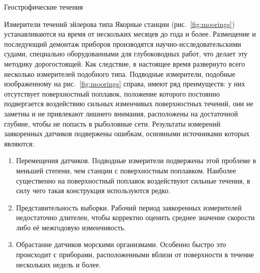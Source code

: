 \begin{chapter}{Геострофические течения}
\begin{section}{Измерители течений эйлерова типа}
Якорные станции (рис.~\ref{fig:moorings}) устанавливаются
на время от нескольких месяцев до года и более. Размещение и последующий 
демонтаж приборов производятся научно-исследовательскими судами, 
специально оборудованными для глубоководных работ, что делает эту методику 
дорогостоящей. Как следствие, в настоящее время развернуто всего
несколько измерителей подобного типа.
Подводные измерители, подобные изображенному на рис.~\ref{fig:moorings}
справа, имеют ряд преимуществ: у них отсутствует поверхностный
поплавок, положение которого постоянно подвергается воздействию
сильных изменчивых поверхностных течений, они не заметны и не
привлекают лишнего внимания, расположены на достаточной глубине, чтобы
не попасть в рыболовные сети. Результаты измерений заякоренных
датчиков подвержены ошибкам, основными источниками которых являются:
%
\begin{enumerate}
\item
Перемещения датчиков. Подводные измерители подвержены этой проблеме в
меньшей степени, чем станции с поверхностным поплавком. Наиболее существенно 
на поверхностный поплавок воздействуют сильные течения, в силу чего
такая конструкция используются редко.
%

\item
Представительность выборки.
Рабочий период заякоренных измерителей недостаточно длителен, чтобы
корректно оценить среднее значение скорости либо её межгодовую изменчивость.
%

\item
Обрастание датчиков морскими организмами. Особенно быстро это происходит
с приборами, расположенными вблизи от поверхности в течение нескольких
недель и более.
%
\end{enumerate}


\end{section}
\end{chapter}
